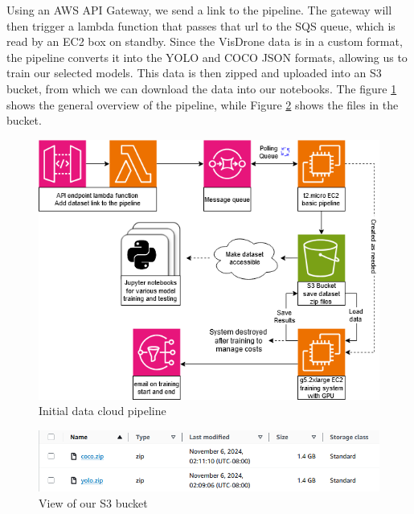 \documentclass[stu,12pt,floatsintext]{apa7}
\begin{document}
Using an AWS API Gateway, we send a link to the  pipeline. The gateway will then trigger a lambda function that passes that url to the SQS queue, which is read by an EC2 box on standby. Since the VisDrone data is in a custom format, the pipeline converts it into the YOLO and COCO JSON formats, allowing us to train our selected models. This data is then zipped and uploaded into an S3 bucket, from which we can download the data into our notebooks. The figure \ref{fig:aws-pipeline} shows the general overview of the pipeline, while Figure \ref{fig:s3} shows the files in the bucket.

\begin{figure}[!htb]
	\centering
	\includegraphics[width=0.5\linewidth]{images/AWS_diagram.png}
	\caption{Initial data cloud pipeline}
	\label{fig:aws-pipeline}
\end{figure}

\begin{figure}[!htb]
	\centering
	\includegraphics[width=0.75\linewidth]{images/s3_bucket.png}
	\caption{View of our S3 bucket}
	\label{fig:s3}
\end{figure}

\printbibliography

\end{document}
